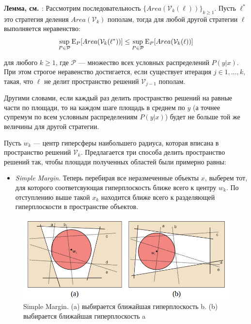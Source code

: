\documentclass[specialist, 12pt, href]{article}
\begin{document}
\textbf{Лемма, см. \cite{TongKoller}}:
Рассмотрим последовательность \(\{Area(\mathcal{V}_k(\ell))\}_{k \geq 1}\).
Пусть  \(\ell^*\) это стратегия деления \(Area(\mathcal{V}_k)\)
пополам, тогда для любой другой стратегии
\(\ell\) выполняется неравенство:
\[\sup_{P \in \mathcal{P}} {\rm E}_P[Area(\mathcal{V}_k(\ell^*))] \leq \sup_{P \in \mathcal{P}} {\rm E}_P[Area(\mathcal{V}_k(\ell))]\]

для любого \(k \geq 1\), где \(\mathcal{P}\) --- множество всех условных
распределений \(P(y|x)\). При этом строгое неравенство достигается, если
существует итерация \(j \in 1,\ldots, k\), такая, что \(\ell\) не делит
пространство решений \(\mathcal{V}_{j - 1}\) пополам.

Другими словами, если каждый раз делить пространство решений на равные части по площади, то на каждом шаге площадь в среднем по $y$ (а точнее супремум по всем условным распределениям $P(y|x)$) будет не больше той же величины для другой стратегии.

Пусть \(w_k\) --- центр гиперсферы наибольшего радиуса, которая вписана
в пространство решений \(\mathcal{V}_k\). Предлагается три способа
делить пространство решений так, чтобы площади полученных областей были
примерно равны:

\begin{itemize}
\item
  \emph{Simple Margin}. Теперь перебирая все неразмеченные объекты
  \(x\), выберем тот, для которого соответсвующая гиперплоскость ближе
  всего к центру \(w_k\). По отступлению выше такой \(x_k\) находится
  ближе всего к разделяющей гиперплоскости в пространстве объектов.
\end{itemize}

\begin{figure}[htbp]
\centering
\includegraphics[width=5in]{img/simplemargin.png}
\caption{Simple Margin. (a) выбирается ближайшая гиперплоскость
b. (b) выбирается ближайшая гиперплоскость a}
\end{figure}
\end{document}
